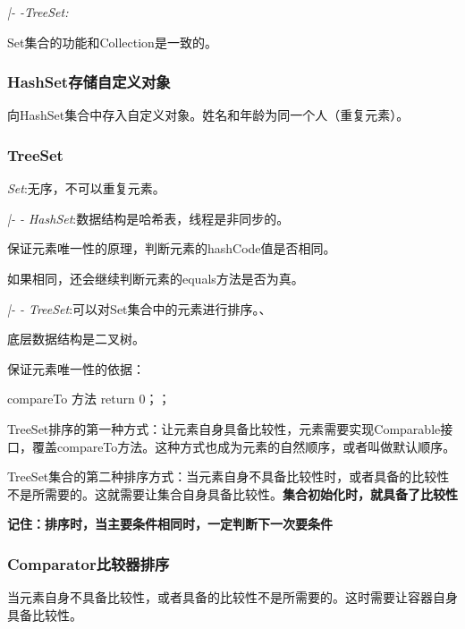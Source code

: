 \documentclass[UTF8]{ctexart}
\begin{document}
\qquad \textit{|- -TreeSet:}

Set集合的功能和Collection是一致的。



\subsubsection{HashSet存储自定义对象}

\textbullet 向HashSet集合中存入自定义对象。姓名和年龄为同一个人（重复元素）。



\subsubsection{TreeSet}

\textit{Set}:无序，不可以重复元素。

\qquad \textit{|- - HashSet}:数据结构是哈希表，线程是非同步的。

\qquad \qquad 保证元素唯一性的原理，判断元素的hashCode值是否相同。

\qquad \qquad 如果相同，还会继续判断元素的equals方法是否为真。

\qquad \textit{|- - TreeSet}:可以对Set集合中的元素进行排序。、

\qquad \qquad 底层数据结构是二叉树。

\qquad \qquad 保证元素唯一性的依据：

\qquad \qquad compareTo 方法 return 0；；

\textbullet TreeSet排序的第一种方式：让元素自身具备比较性，元素需要实现Comparable接口，覆盖compareTo方法。这种方式也成为元素的自然顺序，或者叫做默认顺序。

\textbullet TreeSet集合的第二种排序方式：当元素自身不具备比较性时，或者具备的比较性不是所需要的。这就需要让集合自身具备比较性。\textbf{集合初始化时，就具备了比较性}

\textbf{记住：排序时，当主要条件相同时，一定判断下一次要条件}



\subsubsection{Comparator比较器排序}

当元素自身不具备比较性，或者具备的比较性不是所需要的。这时需要让容器自身具备比较性。
\end{document}
